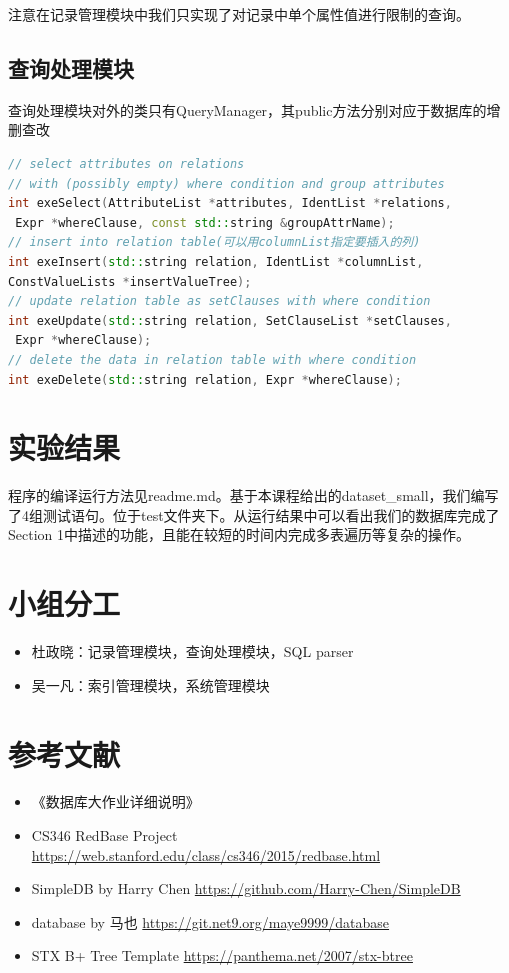 \documentclass[11pt,UTF8]{report}
\begin{document}
注意在记录管理模块中我们只实现了对记录中单个属性值进行限制的查询。

\subsection{查询处理模块}
查询处理模块对外的类只有QueryManager，其public方法分别对应于数据库的增删查改
\begin{lstlisting}[language=C++]
// select attributes on relations 
// with (possibly empty) where condition and group attributes
int exeSelect(AttributeList *attributes, IdentList *relations,
 Expr *whereClause, const std::string &groupAttrName);
// insert into relation table(可以用columnList指定要插入的列)
int exeInsert(std::string relation, IdentList *columnList, 
ConstValueLists *insertValueTree);
// update relation table as setClauses with where condition
int exeUpdate(std::string relation, SetClauseList *setClauses,
 Expr *whereClause);
// delete the data in relation table with where condition
int exeDelete(std::string relation, Expr *whereClause);

\end{lstlisting}


\section{实验结果}
程序的编译运行方法见readme.md。基于本课程给出的dataset\_small，我们编写了4组测试语句。位于test文件夹下。从运行结果中可以看出我们的数据库完成了Section 1中描述的功能，且能在较短的时间内完成多表遍历等复杂的操作。

\section{小组分工}
\begin{itemize}
	\item 杜政晓：记录管理模块，查询处理模块，SQL parser
	\item 吴一凡：索引管理模块，系统管理模块
\end{itemize}

\section{参考文献}
\begin{itemize}
	\item 《数据库大作业详细说明》
	\item CS346 RedBase Project \url{https://web.stanford.edu/class/cs346/2015/redbase.html}
	\item SimpleDB by Harry Chen \url{https://github.com/Harry-Chen/SimpleDB}
	\item database by 马也 \url{https://git.net9.org/maye9999/database}
	\item STX B+ Tree Template \url{https://panthema.net/2007/stx-btree}
\end{itemize}
\end{document}
